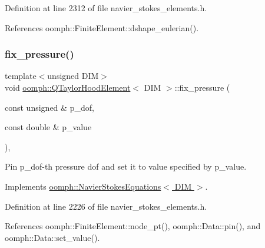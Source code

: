 Definition at line 2312 of file navier\+\_\+stokes\+\_\+elements.\+h.



References oomph\+::\+Finite\+Element\+::dshape\+\_\+eulerian().

\mbox{\label{classoomph_1_1QTaylorHoodElement_ab47f75f2720d9f42d1f073d9bf5f5077}} 
\subsubsection{\texorpdfstring{fix\+\_\+pressure()}{fix\_pressure()}}
{\footnotesize\ttfamily template$<$unsigned D\+IM$>$ \\
void \hyperlink{classoomph_1_1QTaylorHoodElement}{oomph\+::\+Q\+Taylor\+Hood\+Element}$<$ D\+IM $>$\+::fix\+\_\+pressure (\begin{DoxyParamCaption}\item[{const unsigned \&}]{p\+\_\+dof,  }\item[{const double \&}]{p\+\_\+value }\end{DoxyParamCaption})\hspace{0.3cm}{\ttfamily [inline]}, {\ttfamily [virtual]}}



Pin p\+\_\+dof-\/th pressure dof and set it to value specified by p\+\_\+value. 



Implements \hyperlink{classoomph_1_1NavierStokesEquations_aa33a3dd5c1cdba0a044e40ad290e487c}{oomph\+::\+Navier\+Stokes\+Equations$<$ D\+I\+M $>$}.



Definition at line 2226 of file navier\+\_\+stokes\+\_\+elements.\+h.



References oomph\+::\+Finite\+Element\+::node\+\_\+pt(), oomph\+::\+Data\+::pin(), and oomph\+::\+Data\+::set\+\_\+value().

\mbox{\label{classoomph_1_1QTaylorHoodElement_abe161055c22b04059a4a4e71cd2681f0}} 
